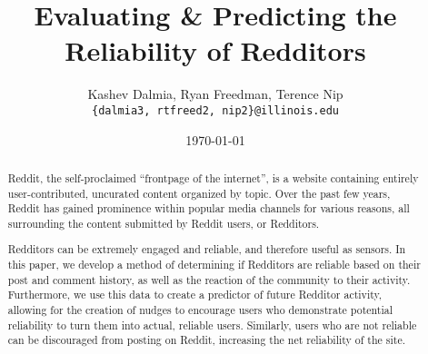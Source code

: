 \documentclass[a4paper]{article}
\title{Evaluating \& Predicting the Reliability of Redditors}
\author{Kashev Dalmia, Ryan Freedman, Terence Nip \\
        \texttt{\{dalmia3, rtfreed2, nip2\}@illinois.edu}
       }
\date{\today}
\begin{document}
\maketitle

\begin{abstract}
Reddit, the self-proclaimed ``frontpage of the internet'', is a website
containing entirely user-contributed, uncurated content organized by topic. Over
the past few years, Reddit has gained prominence within popular media channels
for various reasons, all surrounding the content submitted by Reddit users, or
Redditors.
\newline

Redditors can be extremely engaged and reliable, and therefore useful as
sensors. In this paper, we develop a method of determining if Redditors are
reliable based on their post and comment history, as well as the reaction of the
community to their activity. Furthermore, we use this data to create a predictor
of future Redditor activity, allowing for the creation of nudges to encourage
users who demonstrate potential reliability to turn them into actual, reliable
users.  Similarly, users who are not reliable can be discouraged from posting on
Reddit, increasing the net reliability of the site.

\end{abstract}
\end{document}
